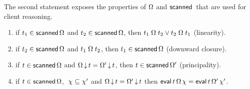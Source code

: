 The second statement exposes the properties of $\Omega$ and
$\scanned$ that are used for client reasoning.
%
\begin{invariant}\label{lem:scanned}%
%
\begin{enumerate}
 \item\label{lem:scan:total} if $ t_1 \in
   \mathsf{scanned}\,\Omega$ and $t_2 \in \mathsf{scanned}\,\Omega$, then
   $ t_1 \mathrel{\Omega} t_2 \vee t_2 \mathrel{\Omega}
   t_1 $ (linearity).
   
 \item \label{lem:scan:wkn} if $ t_2 \in
   \mathsf{scanned}\,\Omega$ and $ t_1 \mathrel{\Omega} t_2$, then
   $t_1 \in \mathsf{scanned}\,\Omega$ (downward closure).


\item \label{lem:scan:prefix} if $t \in
  \mathsf{scanned}\,\Omega$ and $ \Omega\,{\downarrow}\,t =
  \Omega'\,{\downarrow}\,t$, then $t \in \mathsf{scanned}\,\Omega'$ (principality).
  
\item \label{lem:scan:eval} if $t \in
  \mathsf{scanned}\,\Omega$, $\ \chi \subseteq \chi'$ and $
  \Omega\,{\downarrow}\,t = \Omega'\,{\downarrow}\,t$ then $ \mathsf{eval}\,
  t\, \Omega\, \chi = \mathsf{eval}\, t\, \Omega'\, \chi'$. %
\end{enumerate}
\end{invariant}

